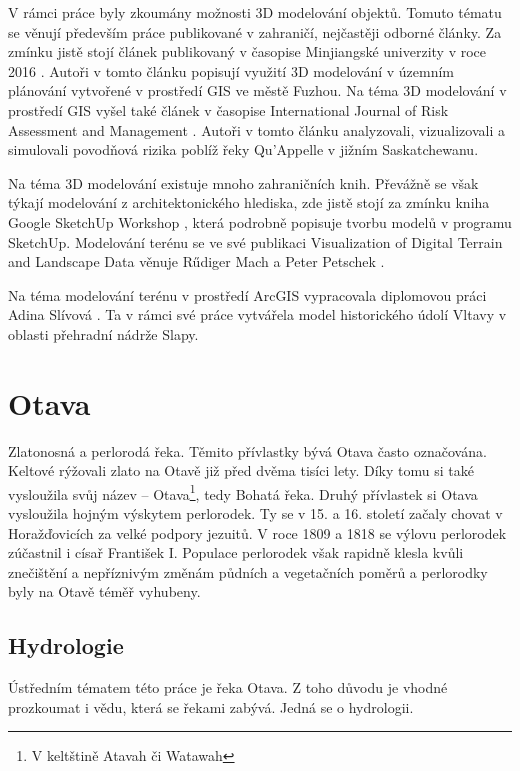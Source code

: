 \documentclass[thesis=M,czech]{FITthesis}[2012/06/26]
\begin{document}
V rámci práce byly zkoumány možnosti 3D modelování objektů. Tomuto tématu se věnují především práce publikované v zahraničí, nejčastěji odborné články. Za zmínku jistě stojí článek publikovaný v časopise Minjiangské univerzity v roce 2016 \cite{cina}. Autoři v tomto článku popisují využití 3D modelování v územním plánování vytvořené v prostředí GIS ve městě Fuzhou. Na téma 3D modelování v prostředí GIS vyšel také článek v časopise International Journal of Risk Assessment and Management \cite{clanek_flood}. Autoři v tomto článku analyzovali, vizualizovali a simulovali povodňová rizika poblíž řeky Qu'Appelle v jižním Saskatchewanu. 

Na téma 3D modelování existuje mnoho zahraničních knih. Převážně se však týkají modelování z architektonického hlediska, zde jistě stojí za zmínku kniha Google SketchUp Workshop \cite{sketchup}, která podrobně popisuje tvorbu modelů v programu SketchUp. Modelování terénu se ve své publikaci Visualization of Digital Terrain and Landscape Data věnuje Rűdiger Mach a Peter Petschek \cite{vizteren}. 

Na téma modelování terénu v prostředí ArcGIS vypracovala diplomovou práci Adina Slívová \cite{adina}. Ta v rámci své práce vytvářela model historického údolí Vltavy v oblasti přehradní nádrže Slapy. 










\chapter{Otava}
Zlatonosná a perlorodá řeka. Těmito přívlastky bývá Otava často označována. Keltové rýžovali zlato na Otavě již před dvěma tisíci lety. Díky tomu si také vysloužila svůj název – Otava\footnote{V keltštině Atavah či Watawah}, tedy Bohatá řeka. Druhý přívlastek si Otava vysloužila hojným výskytem perlorodek. Ty se v 15. a 16. století začaly chovat v Horažďovicích za velké podpory jezuitů. V roce 1809 a 1818 se výlovu perlorodek zúčastnil i císař František I. Populace perlorodek však rapidně klesla kvůli znečištění a nepříznivým změnám půdních a vegetačních poměrů a perlorodky byly na Otavě téměř vyhubeny. \cite{SMOOS}


\section{Hydrologie}
Ústředním tématem této práce je řeka Otava. Z toho důvodu je vhodné prozkoumat i vědu, která se řekami zabývá. Jedná se o hydrologii.
\end{document}
